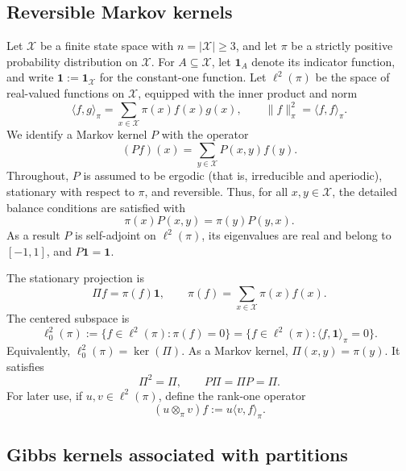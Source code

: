 \documentclass[11pt]{article}
\newcommand{\1}{\mathbf{1}}
\newcommand{\X}{\mathcal{X}}
\begin{document}
\subsection{Reversible Markov kernels}

Let $\X$ be a finite state space with $n=|\X| \geq 3$, and let $\pi$ be a
strictly positive probability distribution on $\X$.  For
$A\subseteq\X$, let $\1_A$ denote its indicator function, and write
$\1:=\1_\X$ for the constant-one function.  Let
$\ell^2(\pi)$ be the space of real-valued functions on $\X$, equipped
with the inner product and norm
\[
    \langle f,g\rangle_\pi
    =\sum_{x\in\X}\pi(x)f(x)g(x),
    \qquad
    \|f\|_\pi^2=\langle f,f\rangle_\pi.
\]
We identify a Markov kernel $P$ with the operator
\[
    (Pf)(x)=\sum_{y\in\X}P(x,y)f(y).
\]
Throughout, $P$ is assumed to be ergodic (that is, irreducible and
aperiodic), stationary with respect to $\pi$, and reversible.  Thus,
for all $x,y\in\X$, the detailed balance conditions are satisfied with
\[
    \pi(x)P(x,y)=\pi(y)P(y,x).
\]
As a result $P$ is self-adjoint on $\ell^2(\pi)$, its eigenvalues are real and
belong to $[-1,1]$, and $P\1=\1$.

The stationary projection is
\[
    \Pi f=\pi(f)\1,
    \qquad
    \pi(f)=\sum_{x\in\X}\pi(x)f(x).
\]
The centered subspace is
\begin{equation}
    \ell^2_0(\pi)
    :=\{f\in\ell^2(\pi):\pi(f)=0\}
    =\{f\in\ell^2(\pi):\langle f,\1\rangle_\pi=0\}.
    \label{eq:centered-subspace}
\end{equation}
Equivalently, $\ell^2_0(\pi)=\ker(\Pi)$.
As a Markov kernel, $\Pi(x,y)=\pi(y)$.  It satisfies
\[
    \Pi^2=\Pi,
    \qquad
    P\Pi=\Pi P=\Pi.
\]
For later use, if $u,v\in\ell^2(\pi)$, define the rank-one operator
\[
    (u\otimes_\pi v)f:=u\langle v,f\rangle_\pi.
\]

\subsection{Gibbs kernels associated with partitions}
\end{document}
